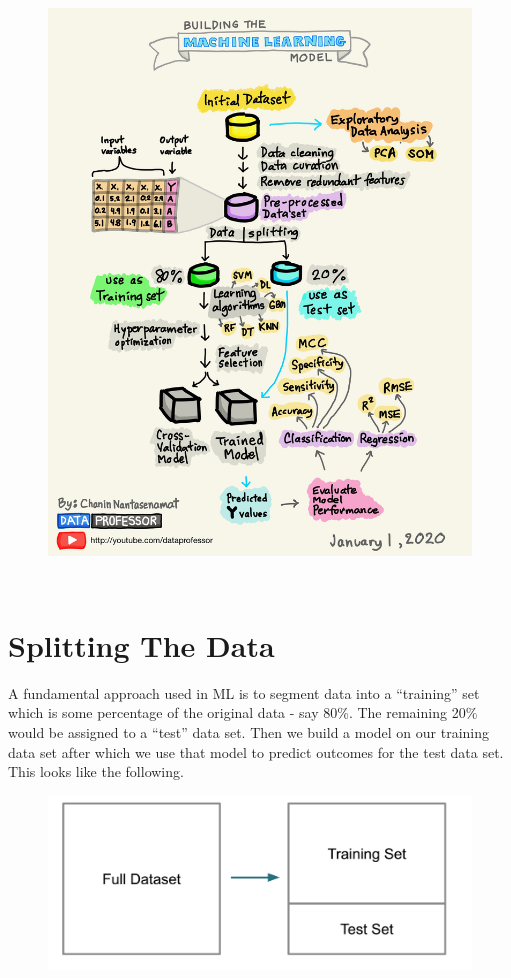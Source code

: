 \documentclass[]{book}
\begin{document}
\begin{figure}
\centering
\includegraphics[height=6.25000in]{./PICS/sworkflow.jpg}
\caption{}
\end{figure}

\chapter{Splitting The Data}\label{splitting-the-data}

A fundamental approach used in ML is to segment data into a ``training''
set which is some percentage of the original data - say 80\%. The
remaining 20\% would be assigned to a ``test'' data set. Then we build a
model on our training data set after which we use that model to predict
outcomes for the test data set. This looks like the following.

\begin{figure}
\centering
\includegraphics[width=5.20833in]{./PICS/crossvalid.png}
\caption{}
\end{figure}
\end{document}
